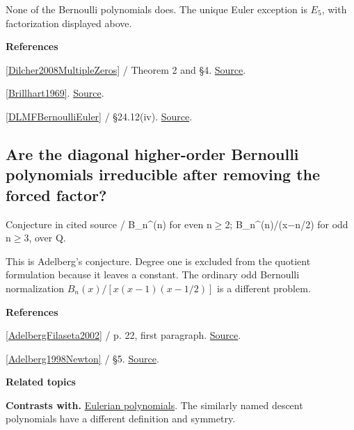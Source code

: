 \documentclass[11pt,a4paper,oneside,openany]{book}
\newenvironment{sources}{\par\smallskip\begingroup\footnotesize\color{atlasgray}\leftskip=10pt\setlength{\parskip}{2pt}}{\par\endgroup\smallskip}
\begin{document}
\color{black} None of the Bernoulli polynomials does. The unique Euler exception is \(E_5\), with factorization displayed above.\par
\begin{sources}
\textbf{References}\par\smallskip
\noindent\hyperlink{ref:Dilcher2008MultipleZeros}{[Dilcher2008MultipleZeros]} / Theorem 2 and §4.  \href{https://doi.org/10.4064/aa134-2-6}{Source}.\par
\noindent\hyperlink{ref:Brillhart1969}{[Brillhart1969]}.  \href{https://doi.org/10.1515/crll.1969.234.45}{Source}.\par
\noindent\hyperlink{ref:DLMFBernoulliEuler}{[DLMFBernoulliEuler]} / §24.12(iv).  \href{https://dlmf.nist.gov/24}{Source}.\par
\end{sources}\color{black}
\subsection*{Are the diagonal higher-order Bernoulli polynomials irreducible after removing the forced factor?}
{\small\sffamily\color{atlasgold}Conjecture in cited source / B\_\allowbreak{}n\textasciicircum{}(n) for even n\ensuremath{\ge}2; B\_\allowbreak{}n\textasciicircum{}(n)/(x\ensuremath{-}n/2) for odd n\ensuremath{\ge}3, over Q.}\par\smallskip
\color{black} This is Adelberg's conjecture. Degree one is excluded from the quotient formulation because it leaves a constant. The ordinary odd Bernoulli normalization \(B_n(x)/[x(x-1)(x-1/2)]\) is a different problem.\par
\begin{sources}
\textbf{References}\par\smallskip
\noindent\hyperlink{ref:AdelbergFilaseta2002}{[AdelbergFilaseta2002]} / p. 22, first paragraph.  \href{https://www.impan.pl/shop/en/publication/transaction/download/product/87393}{Source}.\par
\noindent\hyperlink{ref:Adelberg1998Newton}{[Adelberg1998Newton]} / §5.  \href{https://link.springer.com/chapter/10.1007/978-94-011-5020-0_1}{Source}.\par
\end{sources}\color{black}
\par\medskip\begingroup\footnotesize\setlength{\parskip}{1pt}\textbf{\sffamily\color{atlasgreen}Related topics}\par
\color{black}\textbf{Contrasts with.} \hyperlink{article:eulerian}{Eulerian polynomials}. The similarly named descent polynomials have a different definition and symmetry.\par
\end{document}
